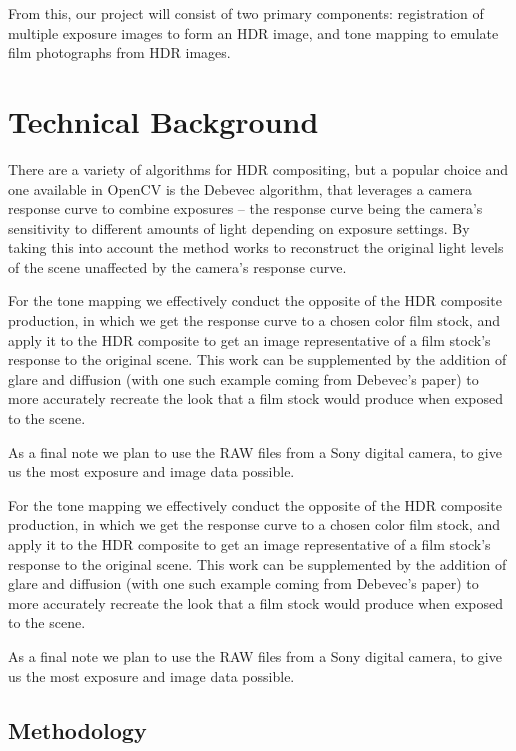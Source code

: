 \documentclass[
	a4paper, %
	10pt, %
	unnumberedsections, %
	twoside, %
]{LTJournalArticle}
\begin{document}
From this, our project will consist of two primary components: registration of multiple exposure images to form an HDR image, and tone mapping to emulate film photographs from HDR images.


\section{Technical Background}

There are a variety of algorithms for HDR compositing, but a popular choice and one available in OpenCV is the Debevec algorithm, that leverages a camera response curve to combine exposures – the response curve being the camera’s sensitivity to different amounts of light depending on exposure settings. By taking this into account the method works to reconstruct the original light levels of the scene unaffected by the camera’s response curve.

For the tone mapping we effectively conduct the opposite of the HDR composite production, in which we get the response curve to a chosen color film stock, and apply it to the HDR composite to get an image representative of a film stock’s response to the original scene. This work can be supplemented by the addition of glare and diffusion (with one such example coming from Debevec’s paper) to more accurately recreate the look that a film stock would produce when exposed to the scene.

As a final note we plan to use the RAW files from a Sony digital camera, to give us the most exposure and image data possible.

For the tone mapping we effectively conduct the opposite of the HDR composite production, in which we get the response curve to a chosen color film stock, and apply it to the HDR composite to get an image representative of a film stock’s response to the original scene. This work can be supplemented by the addition of glare and diffusion (with one such example coming from Debevec’s paper) to more accurately recreate the look that a film stock would produce when exposed to the scene.

As a final note we plan to use the RAW files from a Sony digital camera, to give us the most exposure and image data possible.


\subsection{Methodology}
\end{document}
